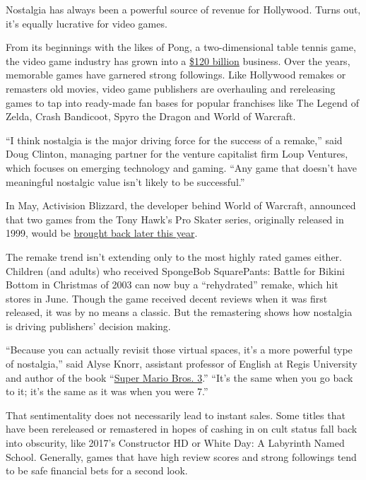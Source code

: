 Nostalgia has always been a powerful source of revenue for Hollywood.
Turns out, it's equally lucrative for video games.

From its beginnings with the likes of Pong, a two-dimensional table
tennis game, the video game industry has grown into a
\href{https://www.businessinsider.com/video-game-industry-120-billion-future-innovation-2019-9}{\$120
billion} business. Over the years, memorable games have garnered strong
followings. Like Hollywood remakes or remasters old movies, video game
publishers are overhauling and rereleasing games to tap into ready-made
fan bases for popular franchises like The Legend of Zelda, Crash
Bandicoot, Spyro the Dragon and World of Warcraft.

``I think nostalgia is the major driving force for the success of a
remake,'' said Doug Clinton, managing partner for the venture capitalist
firm Loup Ventures, which focuses on emerging technology and gaming.
``Any game that doesn't have meaningful nostalgic value isn't likely to
be successful.''

In May, Activision Blizzard, the developer behind World of Warcraft,
announced that two games from the Tony Hawk's Pro Skater series,
originally released in 1999, would be
\href{https://www.barrons.com/articles/activision-is-bringing-back-tony-hawks-skateboarding-games-51589364900}{brought
back later this year}.

The remake trend isn't extending only to the most highly rated games
either. Children (and adults) who received SpongeBob SquarePants: Battle
for Bikini Bottom in Christmas of 2003 can now buy a ``rehydrated''
remake, which hit stores in June. Though the game received decent
reviews when it was first released, it was by no means a classic. But
the remastering shows how nostalgia is driving publishers' decision
making.

``Because you can actually revisit those virtual spaces, it's a more
powerful type of nostalgia,'' said Alyse Knorr, assistant professor of
English at Regis University and author of the book
``\href{https://bossfightbooks.com/products/super-mario-bros-3-by-alyse-knorr}{Super
Mario Bros. 3}.'' ``It's the same when you go back to it; it's the same
as it was when you were 7.''

That sentimentality does not necessarily lead to instant sales. Some
titles that have been rereleased or remastered in hopes of cashing in on
cult status fall back into obscurity, like 2017's Constructor HD or
White Day: A Labyrinth Named School. Generally, games that have high
review scores and strong followings tend to be safe financial bets for a
second look.

